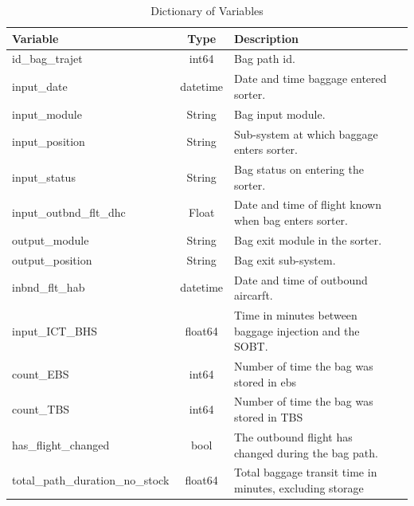 \documentclass[12pt]{article}
\begin{document}

\begin{table}[ht]
    \centering
    \caption{Dictionary of Variables}
    \label{tab:variables}
    \begin{tabularx}{\textwidth}{lclX}
        \toprule
        \textbf{Variable} & \textbf{Type} & \textbf{Description} \\
        \midrule
        id\_bag\_trajet & int64 & Bag path id. \\
        input\_date & datetime & Date and time baggage entered sorter. \\
        input\_module & String & Bag input module. \\
        input\_position & String & Sub-system at which baggage enters sorter. \\
        input\_status & String & Bag status on entering the sorter. \\
        input\_outbnd\_flt\_dhc & Float & Date and time of flight known when bag enters sorter. \\
        output\_module & String & Bag exit module in the sorter. \\
        output\_position & String & Bag exit sub-system. \\
        inbnd\_flt\_hab & datetime &  Date and time of outbound aircarft.\\
        input\_ICT\_BHS & float64 & Time in minutes between baggage injection and the SOBT. \\
        count\_EBS & int64 & Number of time the bag was stored in \acrshort{ebs} \\
        count\_TBS & int64 & Number of time the bag was stored in TBS \\
        has\_flight\_changed & bool & The outbound flight has changed during the bag path. \\
        total\_path\_duration\_no\_stock & float64 & Total baggage transit time in minutes, excluding storage \\

\end{tabularx}
\end{table}
\end{document}
